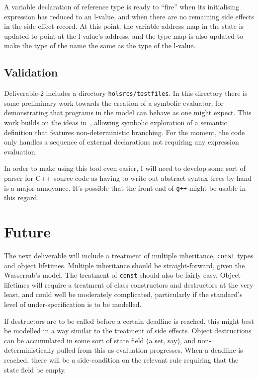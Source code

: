 \documentclass[11pt]{article}
\begin{document}
A variable declaration of reference type is ready to ``fire'' when its
initialising expression has reduced to an l-value, and when there are
no remaining side effects in the side effect record.  At this point,
the variable address map in the state is updated to point at the
l-value's address, and the type map is also updated to make the type
of the name the same as the type of the l-value.


\subsection{Validation}
\label{sec:validation}

Deliverable-2 includes a directory \texttt{holsrcs/testfiles}.  In
this directory there is some preliminary work towards the creation of
a symbolic evaluator, for demonstrating that programs in the model can
behave as one might expect.  This work builds on the ideas
in~\cite{netsem:popl2006}, allowing symbolic exploration of a semantic
definition that features non-deterministic branching.  For the moment,
the code only handles a sequence of external declarations not
requiring any expression evaluation.

In order to make using this tool even easier, I will need to develop
some sort of parser for C++ source code as having to write out
abstract syntax trees by hand is a major annoyance.  It's possible
that the front-end of \texttt{g++} might be usable in this regard.

\section{Future}

The next deliverable will include a treatment of multiple inheritance,
\texttt{const} types and object lifetimes.  Multiple inheritance
should be straight-forward, given the Wasserrab's model.  The
treatment of \texttt{const} should also be fairly easy.  Object
lifetimes will require a treatment of class constructors and
destructors at the very least, and could well be moderately
complicated, particularly if the standard's level of
under-specification is to be modelled.

If destructors are to be called before a certain deadline is reached,
this might best be modelled in a way similar to the treatment of side
effects.  Object destructions can be accumulated in some sort of state
field (a set, say), and non-deterministically pulled from this as
evaluation progresses.  When a deadline is reached, there will be a
side-condition on the relevant rule requiring that the state field be
empty.



\end{document}
